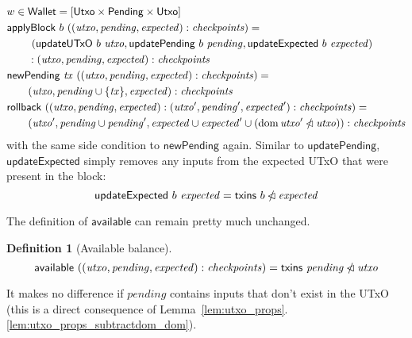 \documentclass{article}
\newcommand{\restrictdom}{\lhd}
\newcommand{\subtractdom}{\mathbin{\slashed{\restrictdom}}}
\DeclareMathOperator{\dom}{dom}
\newtheorem{definition}{Definition}
\begin{document}
\begin{align*}
& w \in \mathsf{Wallet} = [\mathsf{Utxo} \times \mathsf{Pending} \times \mathsf{Utxo}] \\
& \mathsf{applyBlock} ~ b ~ ((\mathit{utxo}, \mathit{pending}, \mathit{expected}) : \mathit{checkpoints}) = \\
& \qquad ~ (\mathsf{updateUTxO} ~ b ~ \mathit{utxo}, \mathsf{updatePending} ~ b ~ \mathit{pending}, \mathsf{updateExpected} ~ b ~ \mathit{expected}) \\
& \qquad : (\mathit{utxo}, \mathit{pending}, \mathit{expected}) : \mathit{checkpoints} \\
& \mathsf{newPending} ~ \mathit{tx} ~ ((\mathit{utxo}, \mathit{pending}, \mathit{expected}) : \mathit{checkpoints}) = \\
& \qquad (\mathit{utxo}, \mathit{pending} \cup \{\mathit{tx}\}, \mathit{expected}) : \mathit{checkpoints} \\
& \mathsf{rollback} ~ ((\mathit{utxo}, \mathit{pending}, \mathit{expected}) : (\mathit{utxo}', \mathit{pending}', \mathit{expected}') : \mathit{checkpoints}) = \\
& \qquad (\mathit{utxo}', \mathit{pending} \cup \mathit{pending}', \mathit{expected} \cup \mathit{expected}' \cup (\dom \mathit{utxo}' \subtractdom \mathit{utxo})) : \mathit{checkpoints} \\
\end{align*}
%
with the same side condition to $\mathsf{newPending}$ again. Similar to
$\mathsf{updatePending}$, $\mathsf{updateExpected}$ simply removes any inputs
from the expected UTxO that were present in the block:
%
\begin{equation*}
\mathsf{updateExpected} ~ b ~ \mathit{expected} = \mathsf{txins} ~ b \subtractdom \mathit{expected}
\end{equation*}

The definition of $\mathsf{available}$ can remain pretty much unchanged.
%
\begin{definition}[Available balance]
\begin{equation*}
  \mathsf{available} ~ ((\mathit{utxo}, \mathit{pending}, \mathit{expected}) : \mathit{checkpoints})
= \mathsf{txins} ~ \mathit{pending} \subtractdom \mathit{utxo} \\
\end{equation*}
\end{definition}
%
It makes no difference if  $\mathit{pending}$ contains
inputs that don't exist in the UTxO (this is a direct consequence of
Lemma~\ref{lem:utxo_props}.\ref{lem:utxo_props_subtractdom_dom}).
\end{document}
